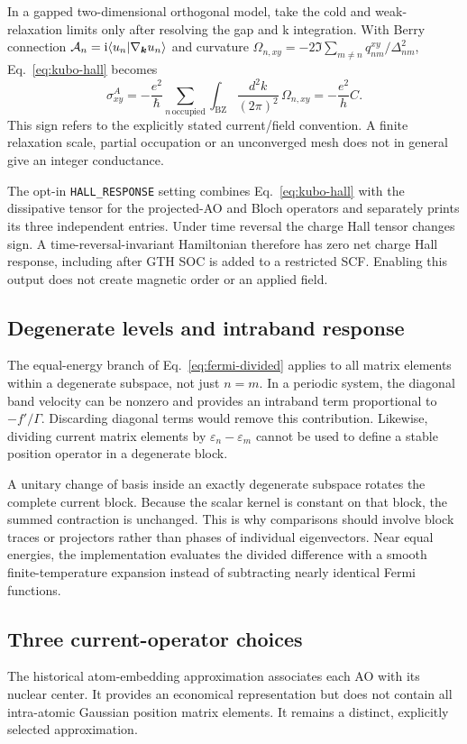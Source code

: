 In a gapped two-dimensional orthogonal model, take the cold and
weak-relaxation limits only after resolving the gap and k integration.
With Berry connection $\mathcal A_n=\mathrm{i}\langle u_n|\nabla_{\bm{k}}u_n\rangle$
and curvature
$\Omega_{n,xy}=-2\Im\sum_{m\ne n}q^{xy}_{nm}/\Delta_{nm}^2$,
Eq.~\eqref{eq:kubo-hall} becomes
\begin{equation}
 \sigma^A_{xy}=-\frac{e^2}{\hbar}
 \sum_{n\,\mathrm{occupied}}\int_{\mathrm{BZ}}
 \frac{d^2k}{(2\pi)^2}\,\Omega_{n,xy}
 =-\frac{e^2}{h}C .
 \label{eq:kubo-chern-limit}
\end{equation}
This sign refers to the explicitly stated current/field convention.
A finite relaxation scale, partial occupation or an unconverged mesh
does not in general give an integer conductance.

The opt-in \texttt{HALL\_RESPONSE} setting combines
Eq.~\eqref{eq:kubo-hall} with the dissipative tensor for the projected-AO
and Bloch operators and separately prints its three independent entries.
Under time reversal the charge Hall tensor changes sign. A
time-reversal-invariant Hamiltonian therefore has zero net charge Hall
response, including after GTH SOC is added to a restricted SCF.
Enabling this output does not create magnetic order or an applied field.

\subsection{Degenerate levels and intraband response}
The equal-energy branch of Eq.~\eqref{eq:fermi-divided} applies to all
matrix elements within a degenerate subspace, not just $n=m$.
In a periodic system, the diagonal band velocity can be nonzero and
provides an intraband term proportional to $-f'/\Gamma$.
Discarding diagonal terms would remove this contribution.
Likewise, dividing current matrix elements by
$\varepsilon_n-\varepsilon_m$ cannot be used to define a stable
position operator in a degenerate block.

A unitary change of basis inside an exactly degenerate subspace rotates
the complete current block. Because the scalar kernel is constant on
that block, the summed contraction is unchanged.
This is why comparisons should involve block traces or projectors
rather than phases of individual eigenvectors.
Near equal energies, the implementation evaluates the divided
difference with a smooth finite-temperature expansion instead of
subtracting nearly identical Fermi functions.

\subsection{Three current-operator choices}
The historical atom-embedding approximation associates each AO with
its nuclear center. It provides an economical representation but
does not contain all intra-atomic Gaussian position matrix elements.
It remains a distinct, explicitly selected approximation.

